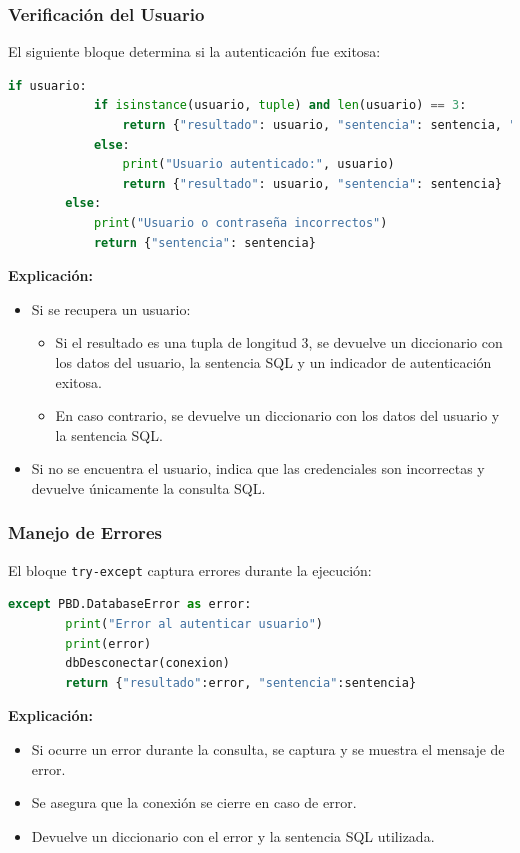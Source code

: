 \documentclass[a4paper,12pt]{article}
\begin{document}
\subsubsection{Verificación del Usuario}
El siguiente bloque determina si la autenticación fue exitosa:

\begin{lstlisting}[language=Python]
        if usuario:
            if isinstance(usuario, tuple) and len(usuario) == 3:
                return {"resultado": usuario, "sentencia": sentencia, "auth": "true"}
            else:
                print("Usuario autenticado:", usuario)
                return {"resultado": usuario, "sentencia": sentencia}
        else:
            print("Usuario o contraseña incorrectos")
            return {"sentencia": sentencia}
\end{lstlisting}

\textbf{Explicación:}
\begin{itemize}
    \item Si se recupera un usuario:
    \begin{itemize}
        \item Si el resultado es una tupla de longitud 3, se devuelve un diccionario con los datos del usuario, la sentencia SQL y un indicador de autenticación exitosa.
        \item En caso contrario, se devuelve un diccionario con los datos del usuario y la sentencia SQL.
    \end{itemize}
    \item Si no se encuentra el usuario, indica que las credenciales son incorrectas y devuelve únicamente la consulta SQL.
\end{itemize}

\subsubsection{Manejo de Errores}
El bloque \texttt{try-except} captura errores durante la ejecución:

\begin{lstlisting}[language=Python]
    except PBD.DatabaseError as error:
        print("Error al autenticar usuario")
        print(error)
        dbDesconectar(conexion)
        return {"resultado":error, "sentencia":sentencia}
\end{lstlisting}

\textbf{Explicación:}
\begin{itemize}
    \item Si ocurre un error durante la consulta, se captura y se muestra el mensaje de error.
    \item Se asegura que la conexión se cierre en caso de error.
    \item Devuelve un diccionario con el error y la sentencia SQL utilizada.
\end{itemize}
\end{document}
